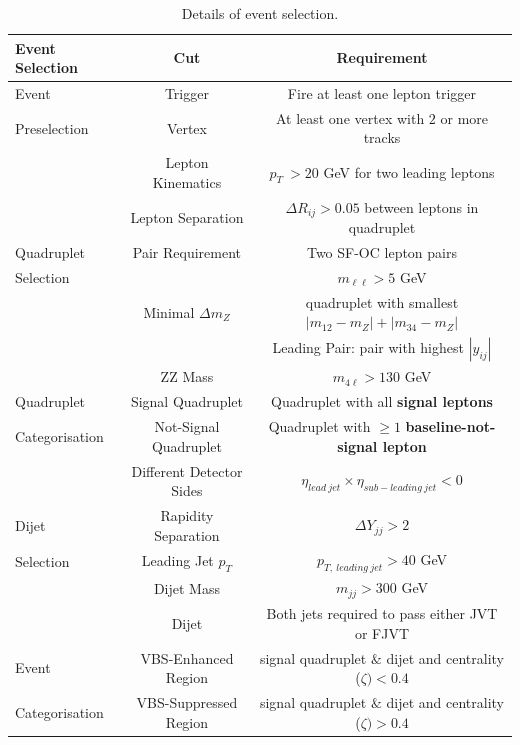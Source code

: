 \begin{table}[!htb]
	\centering
		\caption{Details of event selection.\label{tab:EventSelection}}
		\begin{tabular}{|| l || c | c ||}
		\hline
		Event Selection 		& Cut 					& Requirement														\\
		\hline\hline
		Event  				& Trigger 					&  Fire at least one lepton trigger										\\
		Preselection         		& Vertex				 	& At least one vertex with $2$ or more tracks								\\
		\hline  
		 			& Lepton Kinematics 		& $p_{T}~ > 20$ GeV for two leading leptons						\\
					& Lepton Separation 		& $\Delta R_{ij} > 0.05$ between leptons in quadruplet		\\
		Quadruplet	& Pair Requirement 			& Two SF-OC lepton pairs											\\
		Selection	&						& $m_{\ell\ell} > 5$ GeV									\\
					& Minimal $\Delta m_{Z}$ 	& quadruplet with smallest $|m_{12}	- m_{Z} | + |m_{34}	- m_{Z} |$\\
					&						& Leading Pair: pair with highest $|y_{ij}|$						\\
					& ZZ Mass				& $m_{4\ell} > 130 $ GeV											\\
		\hline  
		Quadruplet 			& Signal Quadruplet			& Quadruplet with all \textbf{signal leptons}							\\
		Categorisation			& Not-Signal Quadruplet 		& Quadruplet with $\geq 1$ \textbf{baseline-not-signal lepton}			\\
		\hline  
		 			& Different Detector Sides		& $\eta_{lead~jet} \times \eta_{sub-leading~jet} < 0 $			\\
		Dijet		& Rapidity Separation 		& $	\Delta Y_{jj}> 2 $												\\
		Selection	& Leading Jet $p_{T}$ 	& 	$p_{T,~leading~jet} > 40$ GeV				\\
					& Dijet Mass 				& $m_{jj} > 300 $ GeV													\\
					& Dijet 		& Both jets required to pass either JVT or FJVT 							\\
		\hline  
							
		Event				& VBS-Enhanced Region 		& signal quadruplet $\&$ dijet and centrality ($\zeta) < 0.4 $				\\
		Categorisation			& VBS-Suppressed Region 	& signal quadruplet $\&$ dijet and centrality ($\zeta) > 0.4$				\\
		
		\hline
	\end{tabular}
\end{table}

